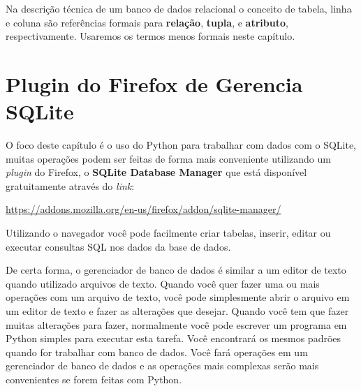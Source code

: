 
Na descrição técnica de um banco de dados relacional o conceito de
tabela, linha e coluna são referências formais para {\bf relação},
{\bf tupla}, e {\bf atributo}, respectivamente.
Usaremos os termos menos formais neste capítulo.

\section{Plugin do Firefox de Gerencia SQLite}

O foco deste capítulo é o uso do Python para trabalhar com dados
com o SQLite, muitas operações podem ser feitas de forma mais
conveniente utilizando um {\it plugin} do Firefox, o {\bf SQLite
  Database Manager} que está disponível gratuitamente através do {\it link}:

\url{https://addons.mozilla.org/en-us/firefox/addon/sqlite-manager/}


Utilizando o navegador você pode facilmente criar tabelas, inserir, editar ou
executar consultas SQL nos dados da base de dados.


De certa forma, o gerenciador de banco de dados é similar a um editor de texto
quando utilizado arquivos de texto. Quando você quer fazer uma ou mais
operações com um arquivo de texto, você pode simplesmente abrir o arquivo em
um editor de texto e fazer as alterações que desejar. Quando você tem que fazer
muitas alterações para fazer, normalmente você pode escrever um programa em
Python simples para executar esta tarefa. Você encontrará os mesmos padrões
quando for trabalhar com banco de dados. Você fará operações em um gerenciador
de banco de dados e as operações mais complexas serão mais convenientes se
forem feitas com Python.

